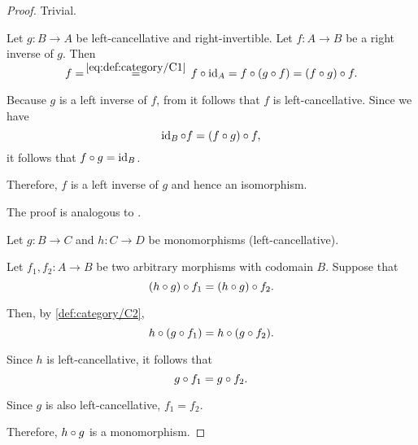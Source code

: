 \begin{proof}
   Trivial.

   Let \( g: B \to A \) be left-cancellative and right-invertible. Let \( f: A \to B \) be a right inverse of \( g \). Then
  \begin{equation*}
    f
    =
    \reloset {\eqref{eq:def:category/C1}} =
    f \bincirc \id_A
    =
    f \bincirc (g \bincirc f)
    =
    (f \bincirc g) \bincirc f.
  \end{equation*}

  Because \( g \) is a left inverse of \( f \), from  it follows that \( f \) is left-cancellative. Since we have
  \begin{equation*}
    \id_B \bincirc f
    =
    (f \bincirc g) \bincirc f,
  \end{equation*}
  it follows that \( f \bincirc g = \id_B \).

  Therefore, \( f \) is a left inverse of \( g \) and hence an isomorphism.

   The proof is analogous to .

   Let \( g: B \to C \) and \( h: C \to D \) be monomorphisms (left-cancellative).

  Let \( f_1, f_2: A \to B \) be two arbitrary morphisms with codomain \( B \). Suppose that
  \begin{equation*}
    (h \bincirc g) \bincirc f_1 = (h \bincirc g) \bincirc f_2.
  \end{equation*}

  Then, by \ref{def:category/C2},
  \begin{equation*}
    h \bincirc (g \bincirc f_1) = h \bincirc (g \bincirc f_2).
  \end{equation*}

  Since \( h \) is left-cancellative, it follows that
  \begin{equation*}
    g \bincirc f_1 = g \bincirc f_2.
  \end{equation*}

  Since \( g \) is also left-cancellative, \( f_1 = f_2 \).

  Therefore, \( h \bincirc g \) is a monomorphism.


\end{proof}
